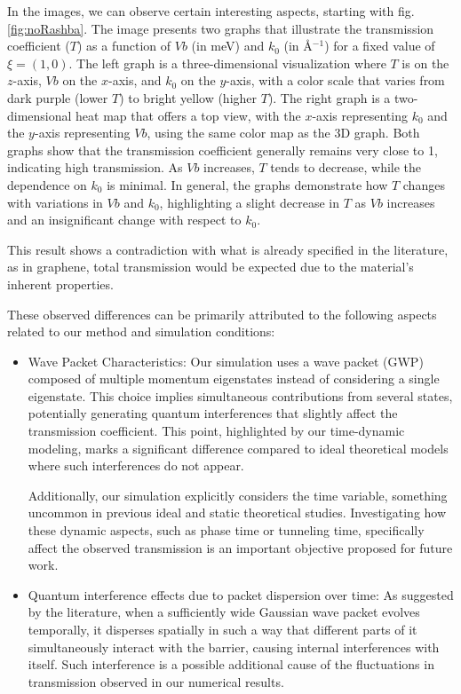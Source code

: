 In the images, we can observe certain interesting aspects, starting with fig.\ref{fig:noRashba}.
The image presents two graphs that illustrate the transmission coefficient ($T$) as a function of $Vb$ (in meV) and $k_0$ (in \AA$^{-1}$) for a fixed value of $\xi = (1, 0)$.
The left graph is a three-dimensional visualization where $T$ is on the $z$-axis, $Vb$ on the $x$-axis, and $k_0$ on the $y$-axis, with a color scale that varies from dark purple (lower $T$) to bright yellow (higher $T$).
The right graph is a two-dimensional heat map that offers a top view, with the $x$-axis representing $k_0$ and the $y$-axis representing $Vb$, using the same color map as the 3D graph.
Both graphs show that the transmission coefficient generally remains very close to 1, indicating high transmission.
As $Vb$ increases, $T$ tends to decrease, while the dependence on $k_0$ is minimal.
In general, the graphs demonstrate how $T$ changes with variations in $Vb$ and $k_0$, highlighting a slight decrease in $T$ as $Vb$ increases and an insignificant change with respect to $k_0$.

This result shows a contradiction with what is already specified in the literature, as in graphene, total transmission would be expected due to the material's inherent properties\cite{horsell2008, Young2009}.

These observed differences can be primarily attributed to the following aspects related to our method and simulation conditions:

\begin{itemize}
    \item Wave Packet Characteristics:
    Our simulation uses a wave packet (GWP) composed of multiple momentum eigenstates instead of considering a single eigenstate.
    This choice implies simultaneous contributions from several states, potentially generating quantum interferences that slightly affect the transmission coefficient\cite{Staelens2021}.
    This point, highlighted by our time-dynamic modeling, marks a significant difference compared to ideal theoretical models where such interferences do not appear.

    Additionally, our simulation explicitly considers the time variable, something uncommon in previous ideal and static theoretical studies.
    Investigating how these dynamic aspects, such as phase time or tunneling time, specifically affect the observed transmission is an important objective proposed for future work.

    \item Quantum interference effects due to packet dispersion over time:
    As suggested by the literature\cite{MolgadoMex2018}, when a sufficiently wide Gaussian wave packet evolves temporally, it disperses spatially in such a way that different parts of it simultaneously interact with the barrier, causing internal interferences with itself.
    Such interference is a possible additional cause of the fluctuations in transmission observed in our numerical results.
\end{itemize}

